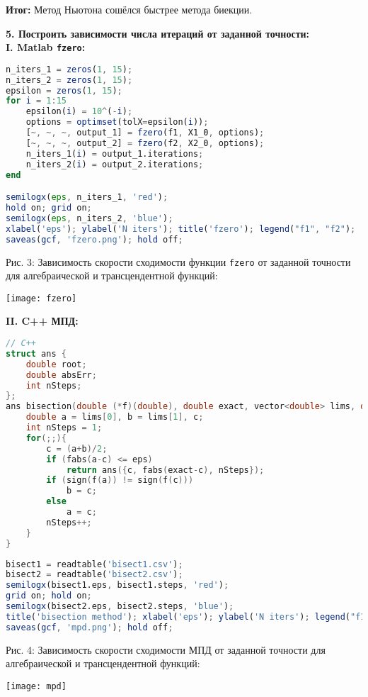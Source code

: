 {\bf Итог:} Метод Ньютона сошёлся быстрее метода биекции.\\

\newpage

{\Large{\textbf{5. Построить зависимости числа итераций от заданной точности:}}}\\
{\large\bf{I. Matlab \texttt{fzero}:}}
\begin{lstlisting}[language=Octave, firstnumber=15]
n_iters_1 = zeros(1, 15);
n_iters_2 = zeros(1, 15);
epsilon = zeros(1, 15);
for i = 1:15
    epsilon(i) = 10^(-i);
    options = optimset(tolX=epsilon(i));
    [~, ~, ~, output_1] = fzero(f1, X1_0, options);
    [~, ~, ~, output_2] = fzero(f2, X2_0, options);
    n_iters_1(i) = output_1.iterations;
    n_iters_2(i) = output_2.iterations;
end

semilogx(eps, n_iters_1, 'red');
hold on; grid on;
semilogx(eps, n_iters_2, 'blue');
xlabel('eps'); ylabel('N iters'); title('fzero'); legend("f1", "f2");
saveas(gcf, 'fzero.png'); hold off;
\end{lstlisting}
Рис. 3: Зависимость скорости сходимости функции \texttt{fzero} от заданной точности для алгебраической и трансцендентной функций:
\begin{center}
    \texttt{[image: fzero]}
\end{center}

\newpage

{\large\bf{II. C++ МПД:}}
\begin{lstlisting}[language=c++]
// C++
struct ans {
    double root;
    double absErr;
    int nSteps;
};
ans bisection(double (*f)(double), double exact, vector<double> lims, double eps){
    double a = lims[0], b = lims[1], c;
    int nSteps = 1;
    for(;;){
        c = (a+b)/2;
        if (fabs(a-c) <= eps)
            return ans({c, fabs(exact-c), nSteps});
        if (sign(f(a)) != sign(f(c)))
            b = c;
        else
            a = c;
        nSteps++;
    }
}
\end{lstlisting}
\begin{lstlisting}[language=Octave, firstnumber=32]
% Matlab
bisect1 = readtable('bisect1.csv');
bisect2 = readtable('bisect2.csv');
semilogx(bisect1.eps, bisect1.steps, 'red');
grid on; hold on;
semilogx(bisect2.eps, bisect2.steps, 'blue');
title('bisection method'); xlabel('eps'); ylabel('N iters'); legend("f1","f2");
saveas(gcf, 'mpd.png'); hold off;
\end{lstlisting}
Рис. 4: Зависимость скорости сходимости МПД от заданной точности для алгебраической и трансцендентной функций:
\begin{center}
    \texttt{[image: mpd]}
\end{center}

